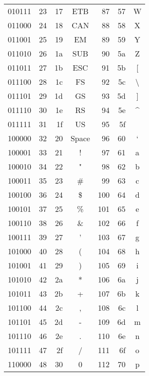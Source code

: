 \begin{tabular}{C|RRC|RRC}
	010111 & 23  & 17  & ETB   & 87  & 57  & W                \\
	011000 & 24  & 18  & CAN   & 88  & 58  & X                \\
	011001 & 25  & 19  & EM    & 89  & 59  & Y                \\
	011010 & 26  & 1a  & SUB   & 90  & 5a  & Z                \\
	011011 & 27  & 1b  & ESC   & 91  & 5b  & [                \\
	011100 & 28  & 1c  & FS    & 92  & 5c  & \textbackslash   \\
	011101 & 29  & 1d  & GS    & 93  & 5d  & ]                \\
	011110 & 30  & 1e  & RS    & 94  & 5e  & \textasciicircum \\
	011111 & 31  & 1f  & US    & 95  & 5f  & \textunderscore  \\
	100000 & 32  & 20  & Space & 96  & 60  & `                \\
	100001 & 33  & 21  & !     & 97  & 61  & a                \\
	100010 & 34  & 22  & "     & 98  & 62  & b                \\
	100011 & 35  & 23  & \#    & 99  & 63  & c                \\
	100100 & 36  & 24  & \$    & 100 & 64  & d                \\
	100101 & 37  & 25  & \%    & 101 & 65  & e                \\
	100110 & 38  & 26  & \&    & 102 & 66  & f                \\
	100111 & 39  & 27  & '     & 103 & 67  & g                \\
	101000 & 40  & 28  & (     & 104 & 68  & h                \\
	101001 & 41  & 29  & )     & 105 & 69  & i                \\
	101010 & 42  & 2a  & *     & 106 & 6a  & j                \\
	101011 & 43  & 2b  & +     & 107 & 6b  & k                \\
	101100 & 44  & 2c  & ,     & 108 & 6c  & l                \\
	101101 & 45  & 2d  & -     & 109 & 6d  & m                \\
	101110 & 46  & 2e  & .     & 110 & 6e  & n                \\
	101111 & 47  & 2f  & /     & 111 & 6f  & o                \\
	110000 & 48  & 30  & 0     & 112 & 70  & p                \\

\end{tabular}
